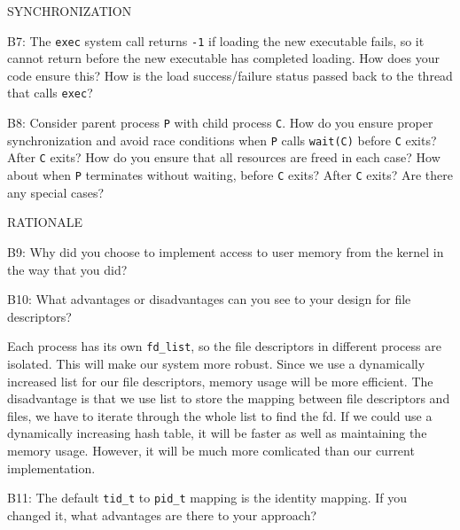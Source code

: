\begin{aspect}{SYNCHRONIZATION}
	\begin{qc}
		B7: The \lstinline{exec} system call returns \lstinline{-1}
		if loading the new executable fails, so it cannot return before the new executable has completed loading.
		How does your code ensure this?
		How is the load success/failure status passed back to the thread that calls \lstinline{exec}?
	\end{qc}

	\begin{qc}
		B8: Consider parent process \lstinline{P} with child process \lstinline{C}.
		How do you ensure proper synchronization and avoid race conditions
		when \lstinline{P} calls \lstinline{wait(C)} before \lstinline{C} exits? After \lstinline{C} exits?
		How do you ensure that all resources are freed in each case?
		How about when \lstinline{P} terminates without waiting, before \lstinline{C} exits? After \lstinline{C} exits?
		Are there any special cases?
	\end{qc}

\end{aspect}

\begin{aspect}{RATIONALE}
	\begin{qc}
		B9: Why did you choose to implement access to user memory from the kernel in the way that you did?
	\end{qc}

	\begin{qc}
		B10: What advantages or disadvantages can you see to your design for file descriptors?
	\end{qc}
	Each process has its own \lstinline{fd_list}, so the file descriptors in different process are isolated. This will make our system more robust. Since we use a dynamically increased list for our file descriptors, memory usage will be more efficient. The disadvantage is that we use list to store the mapping between file descriptors and files, we have to iterate through the whole list to find the fd. If we could use a dynamically increasing hash table, it will be faster as well as maintaining the memory usage. However, it will be much more comlicated than our current implementation.

	\begin{qc}
		B11: The default \lstinline{tid_t} to \lstinline{pid_t} mapping is the identity mapping.
		If you changed it, what advantages are there to your approach?
	\end{qc}
\end{aspect}
